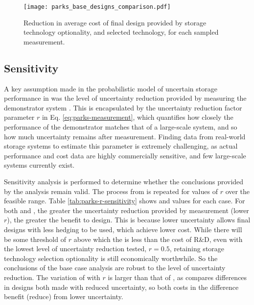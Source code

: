 \begin{figure}
    \centering
    \texttt{[image: parks\_base\_designs\_comparison.pdf]}
    \caption{Reduction in average cost of final design provided by storage technology optionality, and selected technology, for each sampled measurement.}
    \label{fig:parks-design-comparison}
\end{figure}


\clearpage
\subsection{Sensitivity }


A key assumption made in the probabilistic model of uncertain storage performance in  was the level of uncertainty reduction provided by measuring the demonstrator system . This is encapsulated by the uncertainty reduction factor parameter $r$ in Eq. \ref{eq:parks-measurement}, which quantifies how closely the  performance of the demonstrator matches that of a large-scale system, and so how much uncertainty remains after measurement. Finding data from real-world storage systems to estimate this parameter is extremely challenging, as actual performance and cost data are highly commercially sensitive, and few large-scale systems currently exist.

Sensitivity analysis is performed to determine whether the conclusions provided by the  analysis remain valid. The process from  is repeated for values of $r$ over the feasible range. Table \ref{tab:parks-r-sensitivity} shows  and  values for each case. For both  and , the greater the uncertainty reduction provided by measurement (lower $r$), the greater the benefit to design. This is because lower uncertainty allows final designs with less hedging to be used, which achieve lower cost. While there will be some threshold of $r$ above which the  is less than the cost of R\&D, even with the lowest level of uncertainty reduction tested, $r=0.5$, retaining storage technology selection optionality is still economically worthwhile. So the conclusions of the base case analysis are robust to the level of uncertainty reduction. The variation of  with $r$ is larger than that of , as  compares differences in designs both made with reduced uncertainty, so both costs in the difference benefit (reduce) from lower uncertainty.\\

